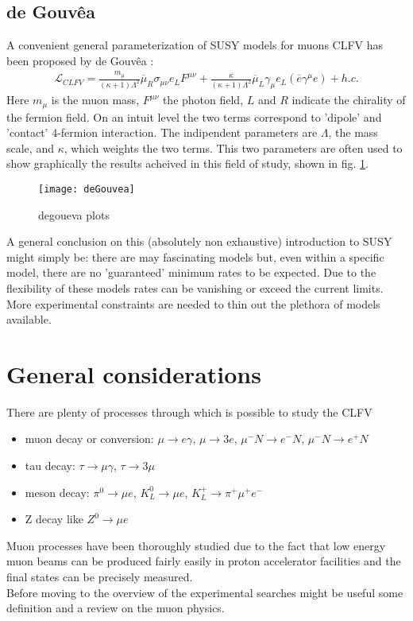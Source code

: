 \documentclass[12pt,a4paper,openright, oneside, titlepage]{book} %
\begin{document}
\subsection{de Gouv\^{e}a}
A convenient general parameterization of SUSY models for muons CLFV  has been proposed by de Gouv\^{e}a \cite{deGouvea}:
\begin{align}
\mathcal{L}_{CLFV}=
\frac{m_\mu}{(\kappa+1)\Lambda^2}\overline{\mu}_R\sigma_{\mu\nu}e_LF^{\mu\nu}+
\frac{\kappa}{(\kappa+1)\Lambda^2}\overline{\mu}_L\gamma_\mu e_L (\overline{e}\gamma^\mu e)+h.c.
\label{eq_deGouvea}
\end{align}
Here $m_\mu$ is the muon mass, $F^{\mu\nu}$ the photon field, $L$ and $R$ indicate the chirality of the fermion field.
On an intuit level the two terms correspond to 'dipole' and 'contact' 4-fermion interaction.
The indipendent parameters are $\Lambda$, the mass scale, and $\kappa$, which weights the two terms. This two parameters are often used to show graphically the results acheived in this field of study, shown in fig. \ref{_deGouvea}.

\begin{figure}[h!]
\texttt{[image: deGouvea]}
\caption{degoueva plots}
\label{_deGouvea}
\end{figure}


\noindent A general conclusion on this (absolutely non exhaustive) introduction to SUSY might simply be: there are may fascinating models but, even within a specific model, there are no 'guaranteed' minimum rates to be expected. Due to the flexibility of these models rates can be vanishing or exceed the current limits.
More experimental constraints are needed to thin out the plethora of models available.

\section{General considerations}
There are plenty of processes through which is possible to study the CLFV
\begin{itemize}
\item muon decay or conversion: $\mu\rightarrow e \gamma$, $\mu\rightarrow 3e$, $\mu^- N\rightarrow e^- N$, $\mu^- N\rightarrow e^+ N$ 
\item tau decay: $\tau\rightarrow \mu \gamma$, $\tau\rightarrow 3\mu$
\item meson decay: $\pi^0\rightarrow \mu e$, $K_L^0\rightarrow\mu e$, $K_L^+\rightarrow \pi^+ \mu^+ e^-$
\item Z decay like $Z^0\rightarrow\mu e$
\end{itemize}
Muon processes have been thoroughly studied due to the fact that low energy muon beams can be produced fairly easily in proton accelerator facilities and the final states can be precisely measured.\\
Before moving to the overview of the experimental searches might be useful some definition and a review on the muon physics.
\end{document}
